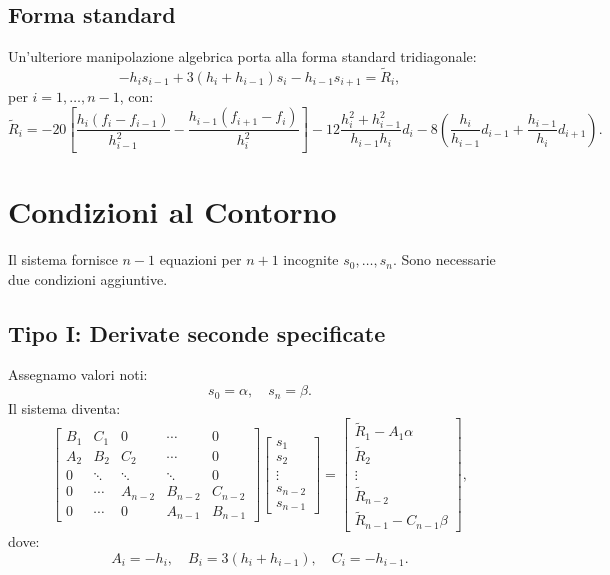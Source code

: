 \documentclass[12pt]{article}
\begin{document}
\subsection{Forma standard}
Un'ulteriore manipolazione algebrica porta alla forma standard tridiagonale:
\[
\boxed{- h_i s_{i-1} + 3(h_i + h_{i-1}) s_i - h_{i-1} s_{i+1} = \tilde{R}_i},
\]
per $i = 1,\dots,n-1$, con:
\[
\boxed{\tilde{R}_i = -20\left[ \frac{h_i(f_i - f_{i-1})}{h_{i-1}^2} - \frac{h_{i-1}(f_{i+1} - f_i)}{h_i^2} \right] - 12 \frac{h_i^2 + h_{i-1}^2}{h_{i-1} h_i} d_i - 8\left( \frac{h_i}{h_{i-1}} d_{i-1} + \frac{h_{i-1}}{h_i} d_{i+1} \right)}.
\]

\section{Condizioni al Contorno}

Il sistema fornisce $n-1$ equazioni per $n+1$ incognite $s_0,\dots,s_n$. Sono necessarie due condizioni aggiuntive.

\subsection{Tipo I: Derivate seconde specificate}
Assegnamo valori noti:
\[
s_0 = \alpha, \quad s_n = \beta.
\]
Il sistema diventa:
\[
\begin{bmatrix}
B_1 & C_1 & 0 & \cdots & 0 \\
A_2 & B_2 & C_2 & \cdots & 0 \\
0 & \ddots & \ddots & \ddots & 0 \\
0 & \cdots & A_{n-2} & B_{n-2} & C_{n-2} \\
0 & \cdots & 0 & A_{n-1} & B_{n-1}
\end{bmatrix}
\begin{bmatrix}
s_1 \\ s_2 \\ \vdots \\ s_{n-2} \\ s_{n-1}
\end{bmatrix}
=
\begin{bmatrix}
\tilde{R}_1 - A_1\alpha \\ \tilde{R}_2 \\ \vdots \\ \tilde{R}_{n-2} \\ \tilde{R}_{n-1} - C_{n-1}\beta
\end{bmatrix},
\]
dove:
\[
A_i = -h_i, \quad B_i = 3(h_i + h_{i-1}), \quad C_i = -h_{i-1}.
\]
\end{document}
